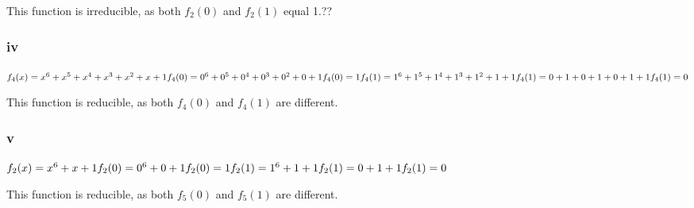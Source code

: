 This function is irreducible, as both $f_{2}(0)$ and $f_{2}(1)$ equal 1.??

\subsubsection{iv}
$
f_{4}(x) = x^{6} + x^{5} + x^{4} + x^{3} + x^{2} + x + 1 	\\
f_{4}(0) = 0^{6} + 0^{5} + 0^{4} + 0^{3} + 0^{2} + 0 + 1 	\\
f_{4}(0) = 1	\\
f_{4}(1) = 1^{6} + 1^{5} + 1^{4} + 1^{3} + 1^{2} + 1 + 1 	\\
f_{4}(1) = 0 + 1 + 0 + 1  + 0 + 1 + 1 	\\
f_{4}(1) = 0 	\\
$

This function is reducible, as both $f_{4}(0)$ and $f_{4}(1)$ are different.

\subsubsection{v}
$
f_{2}(x) = x^{6} + x + 1 	\\
f_{2}(0) = 0^{6} + 0 + 1 	\\
f_{2}(0) = 1	\\
f_{2}(1) = 1^{6} + 1 + 1 	\\
f_{2}(1) = 0 + 1 + 1 	\\
f_{2}(1) = 0 	\\
$

This function is reducible, as both $f_{5}(0)$ and $f_{5}(1)$ are different.

